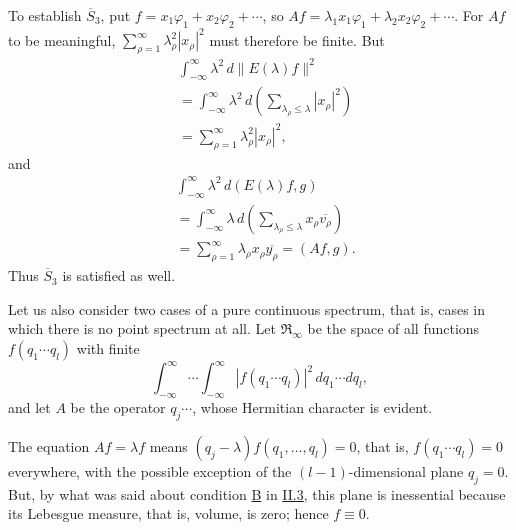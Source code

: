 \documentclass[fontsize=13pt,twoside,openany,headings=normal,parskip=false,bookmarkpackage=false,DIV=calc]{scrbook}
\begin{document}
To establish $\hyperref[cond:II.Sbar3]{\overline{S}_3}$, put $f=x_1\varphi_1+x_2\varphi_2+\cdots$, so $Af=\lambda_1x_1\varphi_1+\lambda_2x_2\varphi_2+\cdots$. For $Af$ to be meaningful, $\sum_{\rho=1}^\infty\lambda_\rho^2|x_\rho|^2$ must therefore be finite. But
\begin{align*}
&\int_{-\infty}^{\infty}\lambda^2\,d\|E(\lambda)f\|^2\\
&=\int_{-\infty}^{\infty}\lambda^2\,d\left(\sum_{\lambda_\rho\leq\lambda}|x_\rho|^2\right)\\
&=\sum_{\rho=1}^\infty\lambda_\rho^2|x_\rho|^2,
\end{align*}
and
\begin{align*}
&\int_{-\infty}^{\infty}\lambda^2\,d(E(\lambda)f,g)\\
&=\int_{-\infty}^{\infty}\lambda\,d\left(\sum_{\lambda_\rho\leq\lambda}x_\rho\overline{v_\rho}\right)\\
&=\sum_{\rho=1}^\infty\lambda_\rho x_\rho\overline{y_\rho}=(Af,g).
\end{align*}
Thus $\hyperref[cond:II.Sbar3]{\overline{S}_3}$ is satisfied as well.

Let us also consider two cases of a pure continuous spectrum, that is, cases in which there is no point spectrum at all. Let $\mathfrak{R}_\infty$ be the space of all functions $f(q_1\cdots q_l)$ with finite
\[
\int_{-\infty}^{\infty}\cdots\int_{-\infty}^{\infty}|f(q_1\cdots q_l)|^2\,dq_1\cdots dq_l,
\]
and let $A$ be the operator $q_j\cdots$, whose Hermitian character is evident.

The equation $Af=\lambda f$ means $(q_j-\lambda)f(q_1,\ldots,q_l)=0$, that is, $f(q_1\cdots q_l)=0$ everywhere, with the possible exception of the $(l-1)$-dimensional plane $q_j=0$. But, by what was said about condition \hyperref[ax:II.B]{B} in \hyperref[sec:II.3]{II.3}, this plane is inessential because its Lebesgue measure, that is, volume, is zero; hence $f\equiv0$.
\end{document}
